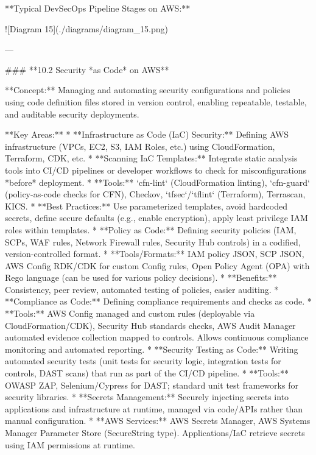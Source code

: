 \documentclass{article}
\begin{document}
**Typical DevSecOps Pipeline Stages on AWS:**


![Diagram 15](./diagrams/diagram_15.png)



---

### **10.2 Security *as Code* on AWS**

**Concept:** Managing and automating security configurations and policies using code definition files stored in version control, enabling repeatable, testable, and auditable security deployments.

**Key Areas:**
* **Infrastructure as Code (IaC) Security:** Defining AWS infrastructure (VPCs, EC2, S3, IAM Roles, etc.) using CloudFormation, Terraform, CDK, etc.
    * **Scanning IaC Templates:** Integrate static analysis tools into CI/CD pipelines or developer workflows to check for misconfigurations *before* deployment.
        * **Tools:** `cfn-lint` (CloudFormation linting), `cfn-guard` (policy-as-code checks for CFN), Checkov, `tfsec`/`tflint` (Terraform), Terrascan, KICS.
    * **Best Practices:** Use parameterized templates, avoid hardcoded secrets, define secure defaults (e.g., enable encryption), apply least privilege IAM roles within templates.
* **Policy as Code:** Defining security policies (IAM, SCPs, WAF rules, Network Firewall rules, Security Hub controls) in a codified, version-controlled format.
    * **Tools/Formats:** IAM policy JSON, SCP JSON, AWS Config RDK/CDK for custom Config rules, Open Policy Agent (OPA) with Rego language (can be used for various policy decisions).
    * **Benefits:** Consistency, peer review, automated testing of policies, easier auditing.
* **Compliance as Code:** Defining compliance requirements and checks as code.
    * **Tools:** AWS Config managed and custom rules (deployable via CloudFormation/CDK), Security Hub standards checks, AWS Audit Manager automated evidence collection mapped to controls. Allows continuous compliance monitoring and automated reporting.
* **Security Testing as Code:** Writing automated security tests (unit tests for security logic, integration tests for controls, DAST scans) that run as part of the CI/CD pipeline.
    * **Tools:** OWASP ZAP, Selenium/Cypress for DAST; standard unit test frameworks for security libraries.
* **Secrets Management:** Securely injecting secrets into applications and infrastructure at runtime, managed via code/APIs rather than manual configuration.
    * **AWS Services:** AWS Secrets Manager, AWS Systems Manager Parameter Store (SecureString type). Applications/IaC retrieve secrets using IAM permissions at runtime.
\end{document}
